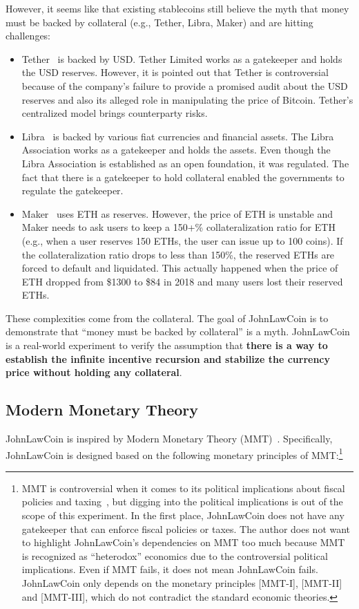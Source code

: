 \documentclass[dvipdfmx,a4paper]{article}
\begin{document}
However, it seems like that existing stablecoins still believe the myth that money must be backed by collateral (e.g., Tether, Libra, Maker) and are hitting challenges:

\begin{itemize}
\item Tether~\cite{tether} is backed by USD. Tether Limited works as a gatekeeper and holds the USD reserves. However, it is pointed out that Tether is controversial because of the company's failure to provide a promised audit about the USD reserves and also its alleged role in manipulating the price of Bitcoin. Tether's centralized model brings counterparty risks.
\item Libra~\cite{libra} is backed by various fiat currencies and financial assets. The Libra Association works as a gatekeeper and holds the assets. Even though the Libra Association is established as an open foundation, it was regulated. The fact that there is a gatekeeper to hold collateral enabled the governments to regulate the gatekeeper.
\item Maker~\cite{makerdao} uses ETH as reserves. However, the price of ETH is unstable and Maker needs to ask users to keep a 150+\% collateralization ratio for ETH (e.g., when a user reserves 150 ETHs, the user can issue up to 100 coins). If the collateralization ratio drops to less than 150\%, the reserved ETHs are forced to default and liquidated. This actually happened when the price of ETH dropped from \$1300 to \$84 in 2018 and many users lost their reserved ETHs.
\end{itemize}

These complexities come from the collateral. The goal of JohnLawCoin is to demonstrate that ``money must be backed by collateral'' is a myth. JohnLawCoin is a real-world experiment to verify the assumption that \textbf{there is a way to establish the infinite incentive recursion and stabilize the currency price without holding any collateral}.

\subsection{Modern Monetary Theory}

JohnLawCoin is inspired by Modern Monetary Theory (MMT)~\cite{kelton2020deficit,mmt2016wray}. Specifically, JohnLawCoin is designed based on the following monetary principles of MMT:\footnote{MMT is controversial when it comes to its political implications about fiscal policies and taxing~\cite{palley2015money}, but digging into the political implications is out of the scope of this experiment. In the first place, JohnLawCoin does not have any gatekeeper that can enforce fiscal policies or taxes. The author does not want to highlight JohnLawCoin's dependencies on MMT too much because MMT is recognized as ``heterodox'' economics due to the controversial political implications. Even if MMT fails, it does not mean JohnLawCoin fails. JohnLawCoin only depends on the monetary principles [MMT-I], [MMT-II] and [MMT-III], which do not contradict the standard economic theories.}
\end{document}
